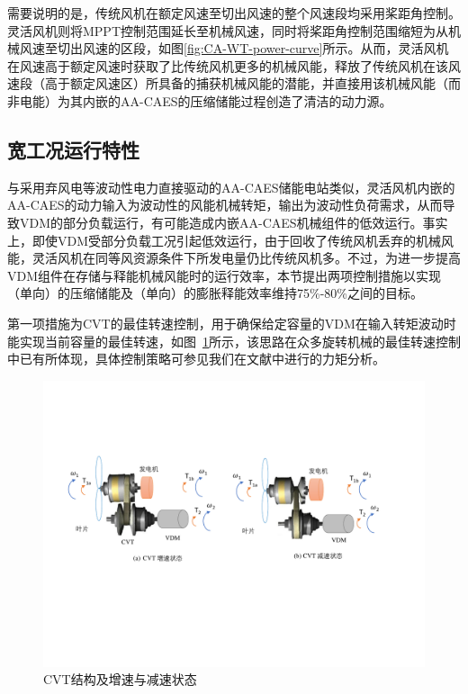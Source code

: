 需要说明的是，传统风机在额定风速至切出风速的整个风速段均采用桨距角控制。灵活风机则将MPPT控制范围延长至机械风速，同时将桨距角控制范围缩短为从机械风速至切出风速的区段，如图\ref{fig:CA-WT-power-curve}所示。从而，灵活风机在风速高于额定风速时获取了比传统风机更多的机械风能，释放了传统风机在该风速段（高于额定风速区）所具备的捕获机械风能的潜能，并直接用该机械风能（而非电能）为其内嵌的AA-CAES的压缩储能过程创造了清洁的动力源。

\subsection{宽工况运行特性}
与采用弃风电等波动性电力直接驱动的AA-CAES储能电站类似，灵活风机内嵌的AA-CAES的动力输入为波动性的风能机械转矩，输出为波动性负荷需求，从而导致VDM的部分负载运行，有可能造成内嵌AA-CAES机械组件的低效运行。事实上，即使VDM受部分负载工况引起低效运行，由于回收了传统风机丢弃的机械风能，灵活风机在同等风资源条件下所发电量仍比传统风机多。不过，为进一步提高VDM组件在存储与释能机械风能时的运行效率，本节提出两项控制措施以实现（单向）的压缩储能及（单向）的膨胀释能效率维持75\%-80\%之间的目标。

第一项措施为CVT的最佳转速控制，用于确保给定容量的VDM在输入转矩波动时能实现当前容量的最佳转速，如图~\ref{fig:CVT-Structure}所示，该思路在众多旋转机械的最佳转速控制中已有所体现，具体控制策略可参见我们在文献中进行的力矩分析。

\begin{figure}[H] %
  \centering
  \includegraphics[scale=0.65]{figures/Chap5-5-CVT-Structure.pdf}
  \caption{CVT结构及增速与减速状态}
  \label{fig:CVT-Structure}
\end{figure}

